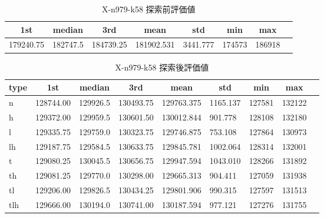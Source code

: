 \begin{table}[htbp]
    \caption{X-n979-k58 探索前評価値}
    \begin{tabular}{|l|l|l|l|l|l|l|l|}\hline
    \multicolumn{1}{|c|}{\textbf{1st}}
    &\multicolumn{1}{c|}{\textbf{median}}
    &\multicolumn{1}{c|}{\textbf{3rd}}
    &\multicolumn{1}{c|}{\textbf{mean}}
    &\multicolumn{1}{c|}{\textbf{std}}
    &\multicolumn{1}{c|}{\textbf{min}}
    &\multicolumn{1}{c|}{\textbf{max}}\\\hline
	179240.75 & 182747.5 & 184739.25 & 181902.531 & 3441.777 & 174573 & 186918\\\hline
	\end{tabular}
\end{table}
\begin{table}[htbp]
    \caption{X-n979-k58 探索後評価値}
    \begin{tabular}{|l|l|l|l|l|l|l|l|l|}\hline
    \multicolumn{1}{|c|}{\textbf{type}}
    &\multicolumn{1}{|c|}{\textbf{1st}}
    &\multicolumn{1}{c|}{\textbf{median}}
    &\multicolumn{1}{c|}{\textbf{3rd}}
    &\multicolumn{1}{c|}{\textbf{mean}}
    &\multicolumn{1}{c|}{\textbf{std}}
    &\multicolumn{1}{c|}{\textbf{min}}
    &\multicolumn{1}{c|}{\textbf{max}}\\\hline
	n & 128744.00 & 129926.5 & 130493.75 & 129763.375 & 1165.137 & 127581 & 132122\\\hline
	h & 129372.00 & 129959.5 & 130601.50 & 130012.844 & 901.778 & 128108 & 132180\\\hline
	l & 129335.75 & 129759.0 & 130323.75 & 129746.875 & 753.108 & 127864 & 130973\\\hline
	lh & 129187.75 & 129584.5 & 130633.75 & 129845.781 & 1002.064 & 128314 & 132001\\\hline
	t & 129080.25 & 130045.5 & 130656.75 & 129947.594 & 1043.010 & 128266 & 131892\\\hline
	th & 129081.25 & 129770.0 & 130298.00 & 129665.313 & 904.411 & 127059 & 131938\\\hline
	tl & 129206.00 & 129826.5 & 130434.25 & 129801.906 & 990.315 & 127597 & 131513\\\hline
	tlh & 129666.00 & 130194.0 & 130741.00 & 130187.594 & 977.121 & 127276 & 131755\\\hline
	\end{tabular}
\end{table}
